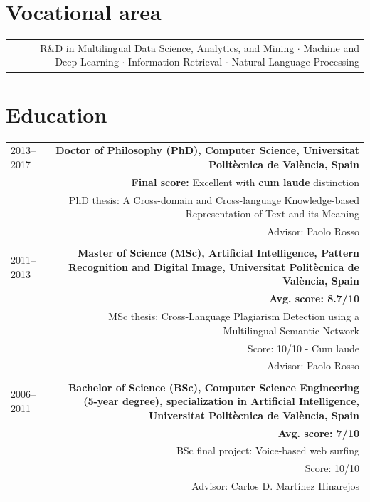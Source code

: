\documentclass[10pt]{article}
\begin{document}
\section*{Vocational area}
\begin{tabular}{L!{\VRule}R}
&R\&D in Multilingual Data Science, Analytics, and Mining $\cdot$ Machine and Deep Learning $\cdot$ Information Retrieval $\cdot$ Natural Language Processing \vspace{5pt}\\
\end{tabular}

\section*{Education}
\begin{tabular}{L!{\VRule}R}
2013--2017 &{\bf Doctor of Philosophy (PhD), Computer Science, Universitat Polit{\`e}cnica de Val{\`e}ncia, Spain}\vspace{5pt}\\
&\textbf{Final score:} Excellent  with \textbf{cum laude} distinction\\
&\scriptsize{PhD thesis: A Cross-domain and Cross-language Knowledge-based Representation of Text and its Meaning}\\
&\scriptsize{Advisor: Paolo Rosso}\\
&\\
2011--2013&{\bf Master of Science (MSc), Artificial Intelligence, Pattern Recognition and Digital Image, Universitat Polit{\`e}cnica de Val{\`e}ncia, Spain}\vspace{5pt}\\
&\bf Avg. score: 8.7/10\\
&\scriptsize{MSc thesis: Cross-Language Plagiarism Detection using a Multilingual Semantic Network}\\
&\scriptsize{Score: 10/10  -  Cum laude}\\
&\scriptsize{Advisor: Paolo Rosso}\\
&\\
2006--2011& \bf Bachelor of Science (BSc), Computer Science Engineering (5-year degree), specialization in Artificial Intelligence, Universitat Polit{\`e}cnica de Val{\`e}ncia, Spain\vspace{5pt}\\
&\bf Avg. score: 7/10\\
&\scriptsize{BSc final project: Voice-based web surfing}\\
&\scriptsize{Score: 10/10}\\
&\scriptsize{Advisor: Carlos D. Mart\'inez Hinarejos}\\ 
\end{tabular}
\end{document}
